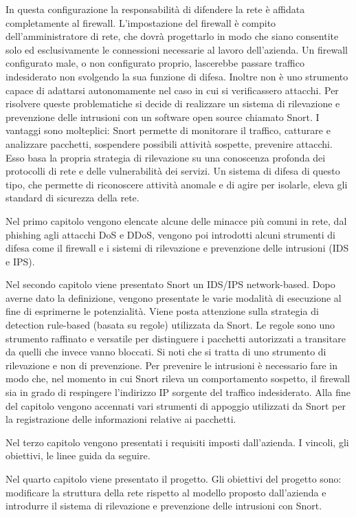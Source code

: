 In questa configurazione la responsabilità di difendere la rete è affidata completamente al firewall. L'impostazione del firewall è compito dell'amministratore di rete, che dovrà progettarlo in modo che siano consentite solo ed esclusivamente le connessioni necessarie al lavoro dell'azienda. Un firewall configurato male, o non configurato proprio, lascerebbe passare traffico indesiderato non svolgendo la sua funzione di difesa. Inoltre non è uno strumento capace di adattarsi autonomamente nel caso in cui si verificassero attacchi.
Per risolvere queste problematiche si decide di realizzare un sistema di rilevazione e prevenzione delle intrusioni con un software open source chiamato Snort. I vantaggi sono molteplici: Snort permette di monitorare il traffico, catturare e analizzare pacchetti, sospendere possibili attività sospette, prevenire attacchi. Esso basa la propria strategia di rilevazione su una conoscenza profonda dei protocolli di rete e delle vulnerabilità dei servizi. Un sistema di difesa di questo tipo, che permette di riconoscere attività anomale e di agire per isolarle, eleva gli standard di sicurezza della rete.

Nel primo capitolo vengono elencate alcune delle minacce più comuni in rete, dal phishing agli attacchi DoS e DDoS, vengono poi introdotti alcuni strumenti di difesa come il firewall e i sistemi di rilevazione e prevenzione delle intrusioni (IDS e IPS).

Nel secondo capitolo viene presentato Snort un IDS/IPS network-based. Dopo averne dato la definizione, vengono presentate le varie modalità di esecuzione al fine di esprimerne le potenzialità. Viene posta attenzione sulla strategia di detection rule-based (basata su regole) utilizzata da Snort. Le regole sono uno strumento raffinato e versatile per distinguere i pacchetti autorizzati a transitare da quelli che invece vanno bloccati. Si noti che si tratta di uno strumento di rilevazione e non di prevenzione. Per prevenire le intrusioni è necessario fare in modo che, nel momento in cui Snort rileva un comportamento sospetto, il firewall sia in grado di respingere l'indirizzo IP sorgente del traffico indesiderato. Alla fine del capitolo vengono accennati vari strumenti di appoggio utilizzati da Snort per la registrazione delle informazioni relative ai pacchetti.

Nel terzo capitolo vengono presentati i requisiti imposti dall'azienda. I vincoli, gli obiettivi, le linee guida da seguire.

Nel quarto capitolo viene presentato il progetto. Gli obiettivi del progetto sono: modificare la struttura della rete rispetto al modello proposto dall'azienda e introdurre il sistema di rilevazione e prevenzione delle intrusioni con Snort.

